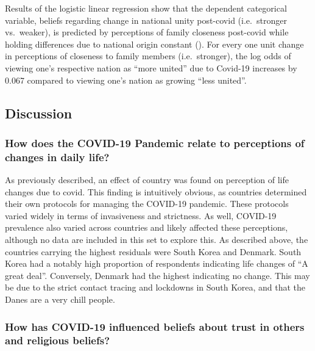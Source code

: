 \documentclass[
  english,
  man]{apa6}
\begin{document}
Results of the logistic linear regression show that the dependent categorical variable, beliefs regarding change in national unity post-covid (i.e.~stronger vs.~weaker), is predicted by perceptions of family closeness post-covid while holding differences due to national origin constant (). For every one unit change in perceptions of closeness to family members (i.e.~stronger), the log odds of viewing one's respective nation as \enquote{more united} due to Covid-19 increases by 0.067 compared to viewing one's nation as growing \enquote{less united}.

\hypertarget{discussion}{%
\subsection{Discussion}\label{discussion}}

\hypertarget{how-does-the-covid-19-pandemic-relate-to-perceptions-of-changes-in-daily-life}{%
\subsubsection{How does the COVID-19 Pandemic relate to perceptions of changes in daily life?}\label{how-does-the-covid-19-pandemic-relate-to-perceptions-of-changes-in-daily-life}}

As previously described, an effect of country was found on perception of life changes due to covid. This finding is intuitively obvious, as countries determined their own protocols for managing the COVID-19 pandemic. These protocols varied widely in terms of invasiveness and strictness. As well, COVID-19 prevalence also varied across countries and likely affected these perceptions, although no data are included in this set to explore this. As described above, the countries carrying the highest residuals were South Korea and Denmark. South Korea had a notably high proportion of respondents indicating life changes of \enquote{A great deal}. Conversely, Denmark had the highest indicating no change. This may be due to the strict contact tracing and lockdowns in South Korea, and that the Danes are a very chill people.

\hypertarget{how-has-covid-19-influenced-beliefs-about-trust-in-others-and-religious-beliefs}{%
\subsubsection{How has COVID-19 influenced beliefs about trust in others and religious beliefs?}\label{how-has-covid-19-influenced-beliefs-about-trust-in-others-and-religious-beliefs}}
\end{document}
